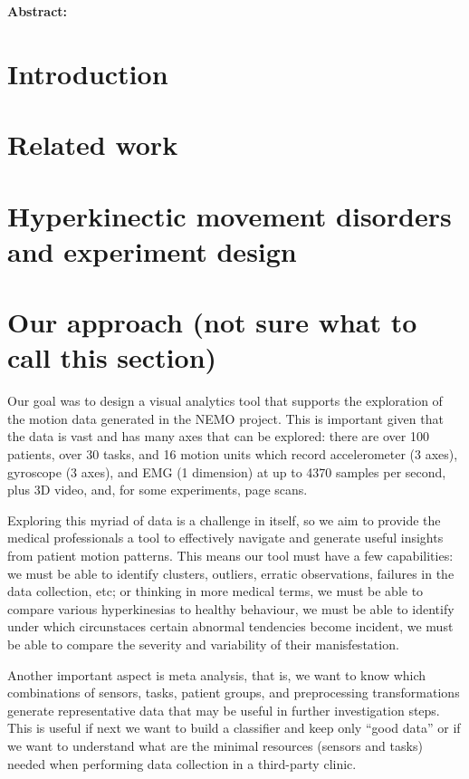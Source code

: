 
\noindent \textbf{Abstract:}

\section{Introduction}

\section{Related work}

\section{Hyperkinectic movement disorders and experiment design}

\section{Our approach (not sure what to call this section)}

Our goal was to design a visual analytics tool that supports the exploration of the motion data generated in the NEMO project. This is important given that the data is vast and has many axes that can be explored: there are over 100 patients, over 30 tasks, and 16 motion units which record accelerometer (3 axes), gyroscope (3 axes), and EMG (1 dimension) at up to 4370 samples per second, plus 3D video, and, for some experiments, page scans. 

Exploring this myriad of data is a challenge in itself, so we aim to provide the medical professionals a tool to effectively navigate and generate useful insights from patient motion patterns. This means our tool must have a few capabilities: we must be able to identify clusters, outliers, erratic observations, failures in the data collection, etc; or thinking in more medical terms, we must be able to compare various hyperkinesias to healthy behaviour, we must be able to identify under which circunstaces certain abnormal tendencies become incident, we must be able to compare the severity and variability of their manisfestation.

Another important aspect is meta analysis, that is, we want to know which combinations of sensors, tasks, patient groups, and preprocessing transformations generate representative data that may be useful in further investigation steps. This is useful if next we want to build a classifier and keep only ``good data'' or if we want to understand what are the minimal resources (sensors and tasks) needed when performing data collection in a third-party clinic.

